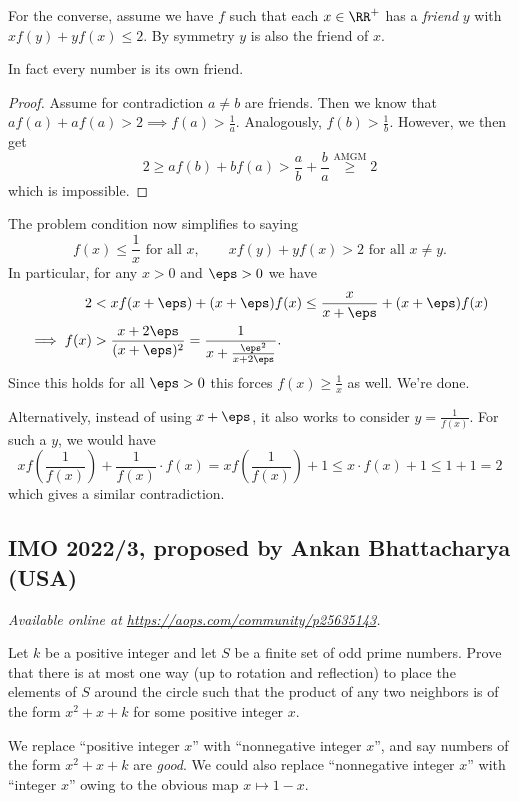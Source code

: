 \documentclass[11pt]{scrartcl}
\begin{document}
For the converse, assume we have $f$ such that
each $x \in \RR^+$ has a \emph{friend} $y$ with $xf(y)+yf(x)\le2$.
By symmetry $y$ is also the friend of $x$.

\begin{claim*}
  In fact every number is its own friend.
\end{claim*}
\begin{proof}
  Assume for contradiction $a \neq b$ are friends.
  Then we know that  $af(a) + af(a) > 2 \implies f(a) > \frac 1a$.
  Analogously, $f(b) > \frac 1b$.
  However, we then get
  \[ 2 \ge a f(b) + b f(a) > \frac ab + \frac ba \overset{\text{AMGM}}{\ge} 2 \]
  which is impossible.
\end{proof}

The problem condition now simplifies to saying
\[ f(x) \le \frac1x \text{ for all $x$}, \qquad
  xf(y) + yf(x) > 2 \text{ for all $x \neq y$}. \]
In particular, for any $x>0$ and $\eps > 0$ we have
\begin{align*}
  2 &< xf(x+\eps) + (x+\eps)f(x) \le \frac{x}{x+\eps} + (x+\eps) f(x) \\
  \implies f(x) &> \frac{x+2\eps}{(x+\eps)^2}
  = \frac{1}{x + \frac{\eps^2}{x+2\eps}}.
\end{align*}
Since this holds for all $\eps > 0$ this forces $f(x) \ge \frac1x$ as well.
We're done.

\begin{remark*}
  Alternatively, instead of using $x+\eps$,
  it also works to consider $y = \frac{1}{f(x)}$.
  For such a $y$, we would have
  \[ xf\left( \frac{1}{f(x)} \right) + \frac{1}{f(x)} \cdot f(x)
    = xf\left( \frac{1}{f(x)} \right) + 1
    \leq x \cdot f(x) + 1 \leq 1 + 1 = 2 \]
  which gives a similar contradiction.
\end{remark*}
\pagebreak

\subsection{IMO 2022/3, proposed by Ankan Bhattacharya (USA)}
\textsl{Available online at \url{https://aops.com/community/p25635143}.}
\begin{mdframed}[style=mdpurplebox,frametitle={Problem statement}]
Let $k$ be a positive integer and let $S$ be a finite set of odd prime numbers.
Prove that there is at most one way (up to rotation and reflection)
to place the elements of $S$ around the circle such that the product
of any two neighbors is of the form $x^2+x+k$ for some positive integer $x$.
\end{mdframed}
We replace ``positive integer $x$'' with ``nonnegative integer $x$'',
and say numbers of the form $x^2+x+k$ are \emph{good}.
We could also replace ``nonnegative integer $x$'' with ``integer $x$''
owing to the obvious map $x \mapsto 1-x$.
\end{document}
